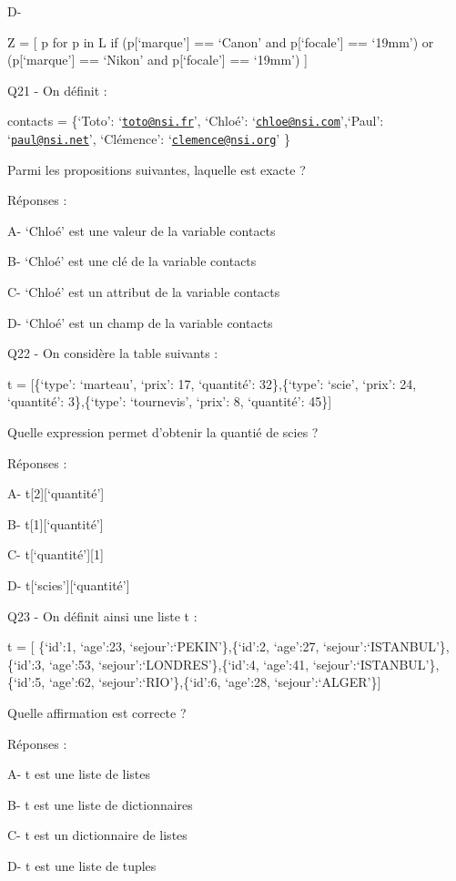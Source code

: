 \documentclass[
]{book}
\begin{document}
D-

Z = {[} p for p in L if (p{[}`marque'{]} == `Canon' and p{[}`focale'{]} == `19mm') or (p{[}`marque'{]} == `Nikon' and p{[}`focale'{]} == `19mm') {]}

Q21 - On définit :

contacts = \{`Toto': `\href{mailto:toto@nsi.fr}{\nolinkurl{toto@nsi.fr}}', `Chloé': `\href{mailto:chloe@nsi.com}{\nolinkurl{chloe@nsi.com}}',`Paul': `\href{mailto:paul@nsi.net}{\nolinkurl{paul@nsi.net}}', `Clémence': `\href{mailto:clemence@nsi.org}{\nolinkurl{clemence@nsi.org}}' \}

Parmi les propositions suivantes, laquelle est exacte ?

Réponses :

A- `Chloé' est une valeur de la variable contacts

B- `Chloé' est une clé de la variable contacts

C- `Chloé' est un attribut de la variable contacts

D- `Chloé' est un champ de la variable contacts

Q22 - On considère la table suivants :

t = {[}\{`type': `marteau', `prix': 17, `quantité': 32\},\{`type': `scie', `prix': 24, `quantité': 3\},\{`type': `tournevis', `prix': 8, `quantité': 45\}{]}

Quelle expression permet d'obtenir la quantié de scies ?

Réponses :

A- t{[}2{]}{[}`quantité'{]}

B- t{[}1{]}{[}`quantité'{]}

C- t{[}`quantité'{]}{[}1{]}

D- t{[}`scies'{]}{[}`quantité'{]}

Q23 - On définit ainsi une liste t :

t = {[} \{`id':1, `age':23, `sejour':`PEKIN'\},\{`id':2, `age':27, `sejour':`ISTANBUL'\},\{`id':3, `age':53, `sejour':`LONDRES'\},\{`id':4, `age':41, `sejour':`ISTANBUL'\},\{`id':5, `age':62, `sejour':`RIO'\},\{`id':6, `age':28, `sejour':`ALGER'\}{]}

Quelle affirmation est correcte ?

Réponses :

A- t est une liste de listes

B- t est une liste de dictionnaires

C- t est un dictionnaire de listes

D- t est une liste de tuples
\end{document}
